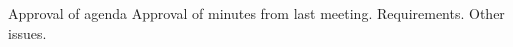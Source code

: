 \nextItem Approval of agenda
\nextItem Approval of minutes from last meeting.
\nextItem Requirements.
\nextItem Other issues.
